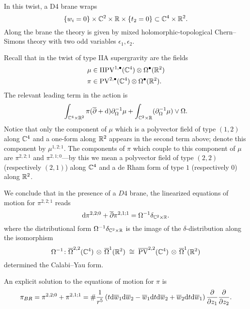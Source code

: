 \documentclass[11pt]{amsart}
\def\PV{{\rm PV}}
\def\hotimes{\, \otimes \,}
\def\ep{\epsilon}
\def\div{\partial_{\Omega}}
\begin{document}
In this twist, a D4 brane wraps 
\[
\{w_i = 0\} \times \mathbb C^2 \times \mathbb R \times \{t_2 = 0\} \subset \mathbb C^4 \times \mathbb R^2 .
\]
Along the brane the theory is given by mixed holomorphic-topological Chern--Simons theory with two odd variables $\ep_1,\ep_2$. 

Recall that in the twist of type IIA supergravity are the fields
\begin{align*}
\mu & \in \Pi \PV^{1,\bu}(\CC^4) \otimes \Omega^\bu(\RR^2) \\
\pi & \in \PV^{2,\bu} (\CC^4) \otimes \Omega^{\bu}(\RR^2) .
\end{align*} 
The relevant leading term in the action is
\[
\int_{\CC^4 \times \RR^2} \pi (\dbar + \d) \div^{-1} \mu + \int_{\CC^2 \times \RR} (\div^{-1} \mu) \vee \Omega .
\]
Notice that only the component of $\mu$ which is a polyvector field of type $(1,2)$ along $\mathbb C^4$ and a one-form along $\mathbb R^2$ appears in the second term above; denote this component by $\mu^{1,2;1}$.  
The components of $\pi$ which couple to this component of $\mu$ are $\pi^{2,2;1}$ and $\pi^{2,1;0}$---by this we mean a polyvector field of type $(2,2)$ (respectively $(2,1)$) along $\mathbb C^4$ and a de Rham form of type $1$ (respectively $0$) along $\mathbb R^2$.  

We conclude that in the presence of a $D4$ brane, the linearized equations of motion for $\pi^{2,2;1}$ reads
\[
{\rm d} \pi^{2,2;0} + \overline{\partial} \pi^{2,1;1} = \Omega^{-1} \delta_{\mathbb C^2 \times \mathbb R} .
\]
where the distributional form $\Omega^{-1} \delta_{\mathbb C^2 \times \mathbb R}$ is the image of the $\delta$-distribution along the isomorphism
\[
\Omega^{-1} \colon \Bar{\Omega}^{2,2} (\CC^4) \hotimes \Bar{\Omega}^1 (\RR^2) \; \cong \; \Bar{\PV}^{2,2} (\CC^4) \hotimes \Bar{\Omega}^1 (\RR^2) 
\]
determined the Calabi--Yau form. 

An explicit solution to the equations of motion for $\pi$ is 
\[
\pi_{BR} = \pi^{2,2;0} + \pi^{2,1;1} = \# \frac{1}{r^5} \left(t {\rm d} \overline{w}_1 {\rm d} \overline{w}_2 - \overline{w}_1 {\rm d} t {\rm d} \overline{w}_2 + \overline{w}_2 {\rm d} t {\rm d} \overline{w}_1\right) \frac{\partial}{\partial z_1} \frac{\partial}{\partial z_2} .
\]
\end{document}
